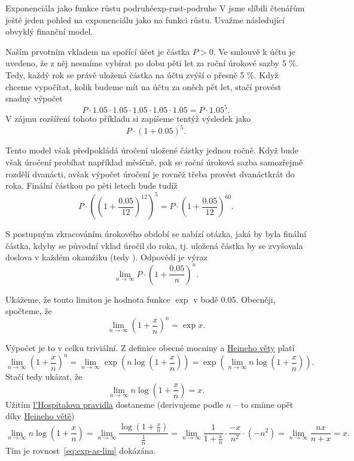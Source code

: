 \begin{example}{Exponenciála jako funkce růstu podruhé}{exp-rust-podruhe}
 V  jsme slíbili čtenářům ještě
 jeden pohled na exponenciálu jako na funkci  růstu. Uvažme
 následující obvyklý finanční model.

 Naším prvotním vkladem na spořící účet je částka $P > 0$. Ve smlouvě k účtu je
 uvedeno, že z něj nesmíme vybírat po dobu pěti let za roční úrokové sazby 5 \%.
 Tedy, každý rok se právě uložená částka na účtu zvýší o přesně 5 \%. Když
 chceme vypočítat, kolik budeme mít na účtu za oněch pět let, stačí provést
 snadný výpočet
 \[
  P \cdot 1.05 \cdot 1.05 \cdot 1.05 \cdot 1.05 \cdot 1.05 = P \cdot 1.05^{5}.
 \]
 V zájmu rozšíření tohoto příkladu si zapíšeme tentýž výsledek jako
 \[
  P \cdot \left( 1 + 0.05 \right)^{5}.
 \]
 
 Tento model však předpokládá úročení uložené částky jednou ročně. Když bude
 však úročení probíhat například měsíčně, pak se roční úroková sazba samozřejmě
 rozdělí dvanácti, avšak výpočet úročení je rovněž třeba provést dvanáctkrát do
 roka. Finální částkou po pěti letech bude tudíž
 \[
  P \cdot \left(\left( 1 + \frac{0.05}{12} \right)^{12}\right)^{5} = P \cdot
  \left( 1 + \frac{0.05}{12} \right)^{60}.
 \]
 
 S postupným zkracováním úrokového období se nabízí otázka, jaká by byla finální
 částka, kdyby se původní vklad úročil  do roka, tj. uložená
 částka by se zvyšovala doslova v každém okamžiku (tedy ). Odpovědí
 je výraz
 \[
  \lim_{n \to \infty} P \cdot \left( 1 + \frac{0.05}{n} \right)^{n}.
 \]
 
 Ukážeme, že touto limitou je hodnota funkce $\exp$ v bodě $0.05$. Obecněji,
 spočteme, že
 \begin{equation*}
  \label{eq:exp-as-lim}
  \tag{$\spadesuit$}
  \lim_{n \to \infty} \left( 1 + \frac{x}{n} \right)^{n} = \exp x.
 \end{equation*}

 Výpočet je to v celku triviální. Z definice obecné mocniny a
 \hyperref[cor:heineho-veta-pro-spojitost]{Heineho věty} platí
 \[
  \lim_{n \to \infty} \left( 1 + \frac{x}{n} \right)^{n} = \lim_{n \to \infty}
  \exp \left( n \log \left( 1 + \frac{x}{n} \right) \right) = \exp \left(
  \lim_{n \to \infty} n \log \left(1 + \frac{x}{n}\right) \right).
 \]
 Stačí tedy ukázat, že
 \[
  \lim_{n \to \infty} n \log \left( 1+\frac{x}{n} \right) = x.
 \]
 Užitím \hyperref[thm:lhospitalovo-pravidlo]{l'Hospitalova pravidla} dostaneme
 (derivujeme podle $n$ -- to smíme opět díky \hyperref[thm:heineho]{Heineho
 větě})
 \[
  \lim_{n \to \infty} n \log \left( 1+\frac{x}{n} \right) = \lim_{n \to \infty}
  \frac{\log \left( 1 + \frac{x}{n} \right)}{\frac{1}{n}} = \lim_{n \to \infty}
  \frac{1}{1+\frac{x}{n}} \cdot \frac{-x}{n^2} \cdot (-n^2) = \lim_{n \to
  \infty} \frac{nx}{n + x} = x.
 \]
 Tím je rovnost~\eqref{eq:exp-as-lim} dokázána.
\end{example}
